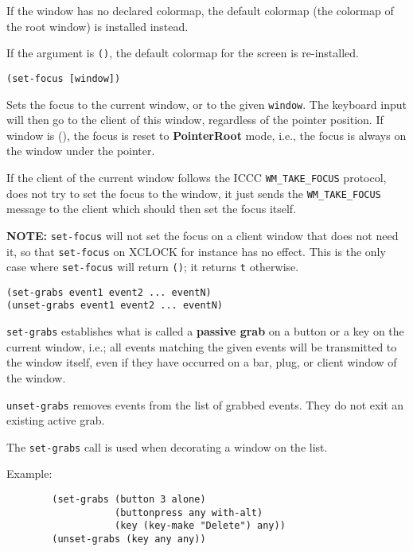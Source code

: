 If the window has no declared colormap, the default colormap (the colormap
of the root window) is installed instead.

If the argument is \verb"()", the default colormap for the screen is
re-installed.

        
{\usagefont\begin{verbatim}
(set-focus [window])
\end{verbatim}}\usageupspace

Sets the focus to the current window, or to the given \verb"window". The
keyboard input will then go to the client of this window, regardless of the
pointer position. If window is (), the focus is reset to {\bf PointerRoot}
mode, i.e., the focus is always on the window under the pointer.

If the client of the current window follows the ICCC
\verb"WM_TAKE_FOCUS" protocol, {\GWM} does not try to set the focus to the
window, it just sends the \verb"WM_TAKE_FOCUS" message to the client
which should then set the focus itself.

{\bf NOTE:} \verb"set-focus" will not set the focus on a client window that
does not need it, so that \verb"set-focus" on XCLOCK for instance has no
effect. This is the only case where \verb"set-focus" will return \verb"()";
it returns \verb"t" otherwise.


{\usagefont\begin{verbatim}
(set-grabs event1 event2 ... eventN)
(unset-grabs event1 event2 ... eventN)
\end{verbatim}}\usageupspace

{\tt set-grabs} establishes what is called a {\bf passive grab} on a button
or a key on the current window, i.e.; all events matching the given events
will be transmitted to the window itself, even if they have occurred on a
bar, plug, or client window of the window.

{\tt unset-grabs} removes events from the list of grabbed events. They do
not exit an existing active grab.

The {\tt set-grabs} call is used when decorating a window on the
 list.

Example:{\exemplefont\upspace\begin{verbatim}
        (set-grabs (button 3 alone) 
                   (buttonpress any with-alt)
                   (key (key-make "Delete") any))
        (unset-grabs (key any any))
\end{verbatim}}


